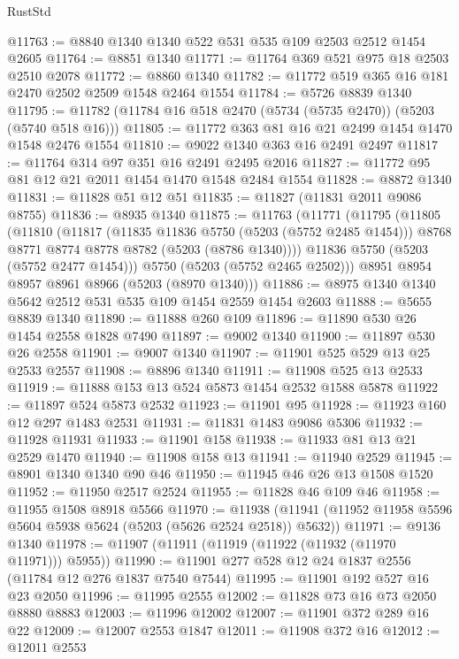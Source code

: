 \begin{lexlean}{RustStd}
\begin{coremodule}
@11763 := @8840 @1340 @1340 @522 @531 @535 @109 @2503 @2512 @1454 @2605
@11764 := @8851 @1340
@11771 := @11764 @369 @521 @975 @18 @2503 @2510 @2078
@11772 := @8860 @1340
@11782 := @11772 @519 @365 @16 @181 @2470 @2502 @2509 @1548 @2464 @1554
@11784 := @5726 @8839 @1340
@11795 := @11782 (@11784 @16 @518 @2470 (@5734 (@5735 @2470)) (@5203 (@5740 @518 @16)))
@11805 := @11772 @363 @81 @16 @21 @2499 @1454 @1470 @1548 @2476 @1554
@11810 := @9022 @1340 @363 @16 @2491 @2497
@11817 := @11764 @314 @97 @351 @16 @2491 @2495 @2016
@11827 := @11772 @95 @81 @12 @21 @2011 @1454 @1470 @1548 @2484 @1554
@11828 := @8872 @1340
@11831 := @11828 @51 @12 @51
@11835 := @11827 (@11831 @2011 @9086 @8755)
@11836 := @8935 @1340
@11875 := @11763
    (@11771
      (@11795
        (@11805
          (@11810
            (@11817
              (@11835 @11836 @5750 (@5203 (@5752 @2485 @1454)))
              @8768
              @8771
              @8774
              @8778
              @8782
              (@5203 (@8786 @1340))))
          @11836
          @5750
          (@5203 (@5752 @2477 @1454)))
        @5750
        (@5203 (@5752 @2465 @2502)))
      @8951
      @8954
      @8957
      @8961
      @8966
      (@5203 (@8970 @1340)))
@11886 := @8975 @1340 @1340 @5642 @2512 @531 @535 @109 @1454 @2559 @1454 @2603
@11888 := @5655 @8839 @1340
@11890 := @11888 @260 @109
@11896 := @11890 @530 @26 @1454 @2558 @1828 @7490
@11897 := @9002 @1340
@11900 := @11897 @530 @26 @2558
@11901 := @9007 @1340
@11907 := @11901 @525 @529 @13 @25 @2533 @2557
@11908 := @8896 @1340
@11911 := @11908 @525 @13 @2533
@11919 := @11888 @153 @13 @524 @5873 @1454 @2532 @1588 @5878
@11922 := @11897 @524 @5873 @2532
@11923 := @11901 @95
@11928 := @11923 @160 @12 @297 @1483 @2531
@11931 := @11831 @1483 @9086 @5306
@11932 := @11928 @11931
@11933 := @11901 @158
@11938 := @11933 @81 @13 @21 @2529 @1470
@11940 := @11908 @158 @13
@11941 := @11940 @2529
@11945 := @8901 @1340 @1340 @90 @46
@11950 := @11945 @46 @26 @13 @1508 @1520
@11952 := @11950 @2517 @2524
@11955 := @11828 @46 @109 @46
@11958 := @11955 @1508 @8918 @5566
@11970 := @11938 (@11941 (@11952 @11958 @5596 @5604 @5938 @5624 (@5203 (@5626 @2524 @2518)) @5632))
@11971 := @9136 @1340
@11978 := @11907 (@11911 (@11919 (@11922 (@11932 (@11970 @11971))) @5955))
@11990 := @11901 @277 @528 @12 @24 @1837 @2556 (@11784 @12 @276 @1837 @7540 @7544)
@11995 := @11901 @192 @527 @16 @23 @2050
@11996 := @11995 @2555
@12002 := @11828 @73 @16 @73 @2050 @8880 @8883
@12003 := @11996 @12002
@12007 := @11901 @372 @289 @16 @22
@12009 := @12007 @2553 @1847
@12011 := @11908 @372 @16
@12012 := @12011 @2553

\end{coremodule}
\end{lexlean}
